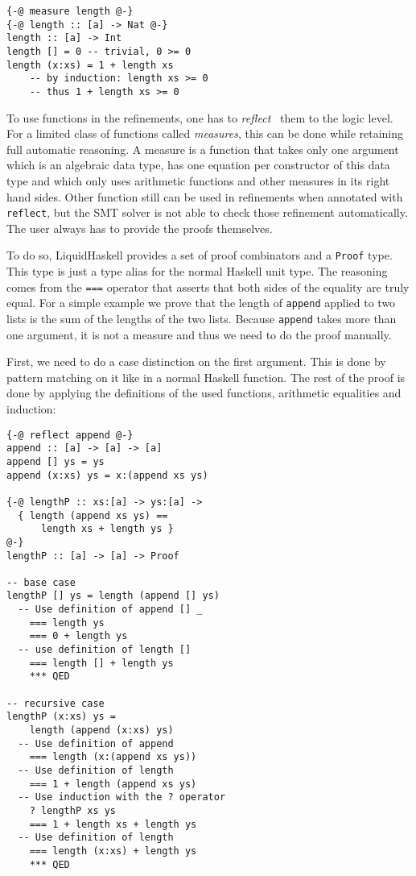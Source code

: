 \documentclass[sigplan,screen]{acmart}
\begin{document}
\begin{lstlisting}
{-@ measure length @-}
{-@ length :: [a] -> Nat @-}
length :: [a] -> Int
length [] = 0 -- trivial, 0 >= 0
length (x:xs) = 1 + length xs
    -- by induction: length xs >= 0
    -- thus 1 + length xs >= 0
\end{lstlisting}

To use functions in the refinements, one has to \textit{reflect}~\cite{reflection} them to the logic level. For a limited class of functions called \textit{measures}, this can be done while retaining full automatic reasoning. A measure is a function that takes only one argument which is an algebraic data type, has one equation per constructor of this data type and which only uses arithmetic functions and other measures in its right hand sides. Other function still can be used in refinements when annotated with \texttt{reflect}, but the SMT solver is not able to check those refinement automatically. The user always has to provide the proofs themselves.

To do so, LiquidHaskell provides a set of proof combinators and a \texttt{Proof} type. This type is just a type alias for the normal Haskell unit type. The reasoning comes from the \texttt{===} operator that asserts that both sides of the equality are truly equal. For a simple example we prove that the length of \texttt{append} applied to two lists is the sum of the lengths of the two lists. Because \texttt{append} takes more than one argument, it is not a measure and thus we need to do the proof manually.

First, we need to do a case distinction on the first argument. This is done by pattern matching on it like in a normal Haskell function. The rest of the proof is done by applying the definitions of the used functions, arithmetic equalities and induction:

\begin{lstlisting}
{-@ reflect append @-}
append :: [a] -> [a] -> [a]
append [] ys = ys
append (x:xs) ys = x:(append xs ys)

{-@ lengthP :: xs:[a] -> ys:[a] ->
  { length (append xs ys) ==
      length xs + length ys }
@-}
lengthP :: [a] -> [a] -> Proof

-- base case
lengthP [] ys = length (append [] ys)
  -- Use definition of append [] _
    === length ys
    === 0 + length ys
  -- use definition of length []
    === length [] + length ys
    *** QED

-- recursive case
lengthP (x:xs) ys =
    length (append (x:xs) ys)
  -- Use definition of append
    === length (x:(append xs ys))
  -- Use definition of length
    === 1 + length (append xs ys)
  -- Use induction with the ? operator
    ? lengthP xs ys
    === 1 + length xs + length ys
  -- Use definition of length
    === length (x:xs) + length ys
    *** QED
\end{lstlisting}
\end{document}
